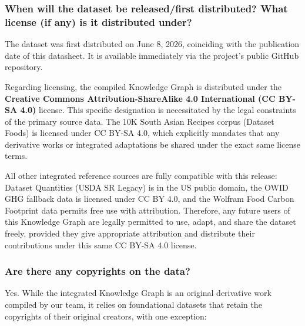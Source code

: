 \documentclass{article}
\newcommand{\question}[1]{#1}
\begin{document}
\question{\subsubsection*{When will the dataset be released/first distributed?
What license (if any) is it distributed under?}}
The dataset was first distributed on June 8, 2026, coinciding with the publication date of this datasheet. It is available immediately via the project's public GitHub repository.

Regarding licensing, the compiled Knowledge Graph is distributed under the \textbf{Creative Commons Attribution-ShareAlike 4.0 International (CC BY-SA 4.0)} license. This specific designation is necessitated by the legal constraints of the primary source data. The 10K South Asian Recipes corpus (Dataset Foods) is licensed under CC BY-SA 4.0, which explicitly mandates that any derivative works or integrated adaptations be shared under the exact same license terms.

All other integrated reference sources are fully compatible with this release: Dataset Quantities (USDA SR Legacy) is in the US public domain, the OWID GHG fallback data is licensed under CC BY 4.0, and the Wolfram Food Carbon Footprint data permits free use with attribution. Therefore, any future users of this Knowledge Graph are legally permitted to use, adapt, and share the dataset freely, provided they give appropriate attribution and distribute their contributions under this same CC BY-SA 4.0 license.

 

\question{\subsubsection*{Are there any copyrights on the data?}}

Yes. While the integrated Knowledge Graph is an original derivative work compiled by our team, it relies on foundational datasets that retain the copyrights of their original creators, with one exception:
\end{document}

